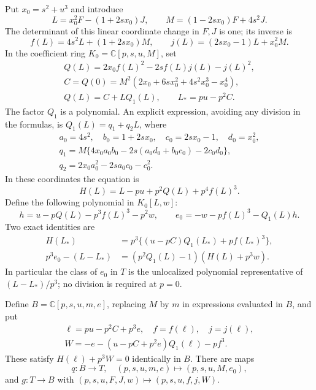 \documentclass[11pt]{article}
\newcommand{\C}{\mathbb C}
\begin{document}
Put $x_0=s^2+u^3$ and introduce
\begin{equation}\label{eq:LM}
L=x_0^2F-(1+2sx_0)J,\qquad
M=(1-2sx_0)F+4s^2J.
\end{equation}
The determinant of this linear coordinate change in $F,J$ is one;
its inverse is
\[
f(L)=4s^2L+(1+2sx_0)M,\qquad
j(L)=(2sx_0-1)L+x_0^2M.
\]
In the coefficient ring $K_0=\C[p,s,u,M]$, set
\begin{equation}\label{eq:Q}
\begin{gathered}
Q(L)=2x_0f(L)^2-2sf(L)j(L)-j(L)^2,\\
C=Q(0)=M^2(2x_0+6sx_0^2+4s^2x_0^3-x_0^4),\\
Q(L)=C+LQ_1(L),\qquad L_*=pu-p^2C.
\end{gathered}
\end{equation}
The factor $Q_1$ is a polynomial. An explicit expression, avoiding any
division in the formulas, is $Q_1(L)=q_1+q_2L$, where
\begin{equation}\label{eq:qcoeff}
\begin{gathered}
a_0=4s^2,\quad b_0=1+2sx_0,\quad c_0=2sx_0-1,\quad d_0=x_0^2,\\
q_1=M\{4x_0a_0b_0-2s(a_0d_0+b_0c_0)-2c_0d_0\},\\
q_2=2x_0a_0^2-2sa_0c_0-c_0^2.
\end{gathered}
\end{equation}
In these coordinates the equation is
\begin{equation}\label{eq:Hexp}
H(L)=L-pu+p^2Q(L)+p^4f(L)^3.
\end{equation}
Define the following polynomial in $K_0[L,w]$:
\begin{equation}\label{eq:e0}
h=u-pQ(L)-p^3f(L)^3-p^2w,\qquad
e_0=-w-pf(L)^3-Q_1(L)h.
\end{equation}
Two exact identities are
\begin{align}
H(L_*)&=p^3\{(u-pC)Q_1(L_*)+pf(L_*)^3\},\label{eq:root}\\
p^3e_0-(L-L_*)&=(p^2Q_1(L)-1)(H(L)+p^3w).\label{eq:cert}
\end{align}
In particular the class of $e_0$ in $T$ is the unlocalized polynomial
representative of $(L-L_*)/p^3$; no division is required at $p=0$.

Define $B=\C[p,s,u,m,e]$, replacing $M$ by $m$ in expressions evaluated
in $B$, and put
\begin{equation}\label{eq:LW}
\begin{gathered}
\ell=pu-p^2C+p^3e,\quad f=f(\ell),\quad j=j(\ell),\\
W=-e-(u-pC+p^2e)Q_1(\ell)-pf^3.
\end{gathered}
\end{equation}
These satisfy $H(\ell)+p^3W=0$ identically in $B$.
There are maps
\[
q:B\longrightarrow T,\quad (p,s,u,m,e)\longmapsto(p,s,u,M,e_0),
\]
and $g:T\to B$ with $(p,s,u,F,J,w)\mapsto(p,s,u,f,j,W)$.
\end{document}
